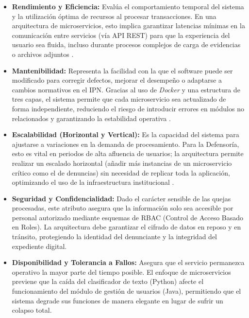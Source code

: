 \begin{itemize}
\item \textbf{Rendimiento y Eficiencia:} Evalúa el comportamiento temporal del sistema y la utilización óptima de recursos al procesar transacciones. En una arquitectura de microservicios, esto implica garantizar latencias mínimas en la comunicación entre servicios (vía API REST) para que la experiencia del usuario sea fluida, incluso durante procesos complejos de carga de evidencias o archivos adjuntos \cite{28} .

\item \textbf{Mantenibilidad:} Representa la facilidad con la que el software puede ser modificado para corregir defectos, mejorar el desempeño o adaptarse a cambios normativos en el IPN. Gracias al uso de \textit{Docker} y una estructura de tres capas, el sistema permite que cada microservicio sea actualizado de forma independiente, reduciendo el riesgo de introducir errores en módulos no relacionados y garantizando la estabilidad operativa \cite{28} .

\item \textbf{Escalabilidad (Horizontal y Vertical):} Es la capacidad del sistema para ajustarse a variaciones en la demanda de procesamiento. Para la Defensoría, esto es vital en periodos de alta afluencia de usuarios; la arquitectura permite realizar un escalado horizontal (añadir más instancias de un microservicio crítico como el de denuncias) sin necesidad de replicar toda la aplicación, optimizando el uso de la infraestructura institucional \cite{29} .

\item \textbf{Seguridad y Confidencialidad:} Dado el carácter sensible de las quejas procesadas, este atributo asegura que la información solo sea accesible por personal autorizado mediante esquemas de RBAC (Control de Acceso Basado en Roles). La arquitectura debe garantizar el cifrado de datos en reposo y en tránsito, protegiendo la identidad del denunciante y la integridad del expediente digital.

\item \textbf{Disponibilidad y Tolerancia a Fallos:} Asegura que el servicio permanezca operativo la mayor parte del tiempo posible. El enfoque de microservicios previene que la caída del clasificador de texto (Python) afecte el funcionamiento del módulo de gestión de usuarios (Java), permitiendo que el sistema degrade sus funciones de manera elegante en lugar de sufrir un colapso total.

\end{itemize}


